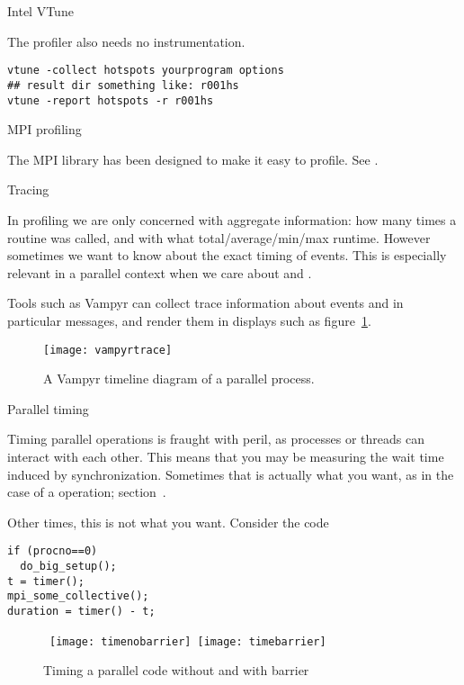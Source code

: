  {Intel VTune}

The  profiler also needs no instrumentation.
\begin{verbatim}
vtune -collect hotspots yourprogram options
## result dir something like: r001hs
vtune -report hotspots -r r001hs
\end{verbatim}

 {MPI profiling}

The MPI library has been designed to make it easy to profile.
See .

 {Tracing}

In profiling we are only concerned with aggregate information: how
many times a routine was called, and with what total/average/min/max
runtime. However sometimes we want to know about the exact timing of
events. This is especially relevant in a parallel context when we care
about  and .

Tools such as Vampyr can collect trace information about
events and in particular messages, and render them in displays such as
figure~\ref{fig:vampyr}.
\begin{figure}[ht]
  \texttt{[image: vampyrtrace]}
  \caption{A Vampyr timeline diagram of a parallel process.}
  \label{fig:vampyr}
\end{figure}


 {Parallel timing}

Timing parallel operations is fraught with peril,
as processes or threads can interact with each other.
This means that you may be measuring the wait time
induced by synchronization.
Sometimes that is actually what you want,
as in the case of a  operation;
section~.

Other times, this is not what you want.
Consider the code
\begin{lstlisting}
if (procno==0)
  do_big_setup();
t = timer();
mpi_some_collective();
duration = timer() - t;
\end{lstlisting}

\begin{figure}[ht]
  \hbox\bgroup
  \texttt{[image: timenobarrier]}
  \texttt{[image: timebarrier]}
  \egroup
  \caption{Timing a parallel code without and with barrier}
  \label{fig:time-collective}
\end{figure}

